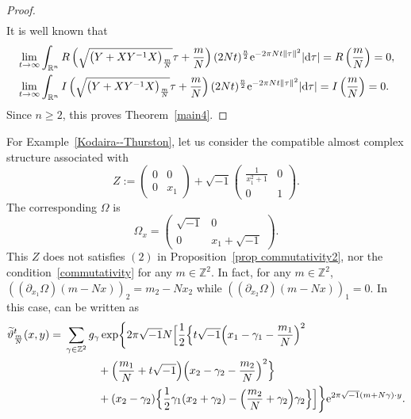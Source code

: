 \documentclass[pdftex]{sigma}
\numberwithin{equation}{section}
\newcommand{\R}{\mathbb{R}}
\newcommand{\Z}{\mathbb{Z}}
\renewcommand{\tilde}{\widetilde}
\newcommand{\abs}[1]{\lvert#1\rvert}
\newcommand{\norm}[1]{\lVert#1\rVert}
\begin{document}
\begin{proof}
\begin{gather*}
\end{gather*}
It is well known that
\begin{align*}
& \lim_{t\to \infty}\int_{\R^n} R\left(\sqrt{\bigl(Y+XY^{-1}X\bigr)_{\frac{m}{N}}}\tau +\frac{m}{N}\right)(2Nt)^\frac{n}{2} {\rm e}^{-2\pi Nt\norm{\tau}^2}\abs{{\rm d}\tau}=R\left(\frac{m}{N}\right)=0, \\
& \lim_{t\to \infty} \int_{\R^n} I\left(\sqrt{\bigl(Y+XY^{-1}X\bigr)_{\frac{m}{N}}}\tau +\frac{m}{N}\right)(2Nt)^\frac{n}{2} {\rm e}^{-2\pi Nt\norm{\tau}^2}\abs{{\rm d}\tau}=I\left(\frac{m}{N}\right)=0.
\end{align*}
Since $n\ge 2$, this proves Theorem~\ref{main4}.
\end{proof}

\begin{Example}%
For Example~\ref{Kodaira--Thurston}, let us consider the compatible almost complex structure associated with
\[
Z:=
\begin{pmatrix}
0 & 0 \\
0 & x_1
\end{pmatrix}
+\sqrt{-1}
\begin{pmatrix}
\frac{1}{x_1^2+1} & 0 \\
0 & 1
\end{pmatrix}.
\]
The corresponding $\Omega$ is
\begin{equation*}
\Omega_x=
\begin{pmatrix}
\sqrt{-1} & 0 \\
0 & x_1+\sqrt{-1}
\end{pmatrix}.
\end{equation*}
This $Z$ does not satisfies $(2)$ in Proposition~\ref{prop commutativity2}, nor
the condition~\eqref{commutativity} for any $m\in \Z^2$. In fact, for any $m\in \Z^2$, $((\partial_{x_1}\Omega)(m-Nx))_2=m_2-Nx_2$ while $((\partial_{x_2}\Omega)(m-Nx))_1=0$. In this case, \smash{${\tilde \vartheta}_{\frac{m}{N}}^t$} can be written as
\begin{align*}
{\tilde \vartheta}_{\frac{m}{N}}^t(x,y)={}&\sum_{\gamma \in \Z^2}g_\gamma \exp\biggl\{2\pi\sqrt{-1}N\Bigl[\frac{1}{2}\Bigl\{t\sqrt{-1}\Bigl(x_1-\gamma_1-\frac{m_1}{N}\Bigl)^2\\
& \hphantom{\sum_{\gamma \in \Z^2}g_\gamma}{}
+\Bigl(\frac{m_1}{N}+t\sqrt{-1}\Bigr)\Bigl(x_2-\gamma_2-\frac{m_2}{N}\Bigr)^2\Bigr\}\\
& \hphantom{\sum_{\gamma \in \Z^2}g_\gamma}{} +(x_2-\gamma_2)\Bigl\{ \frac{1}{2}\gamma_1(x_2+\gamma_2)-\Bigl( \frac{m_2}{N}+\gamma_2\Bigr)\gamma_2\Bigr\}\Bigr]\biggr\}{\rm e}^{2\pi\sqrt{-1}(m+N\gamma)\cdot y}.
\end{align*}
\end{Example}
\end{document}
